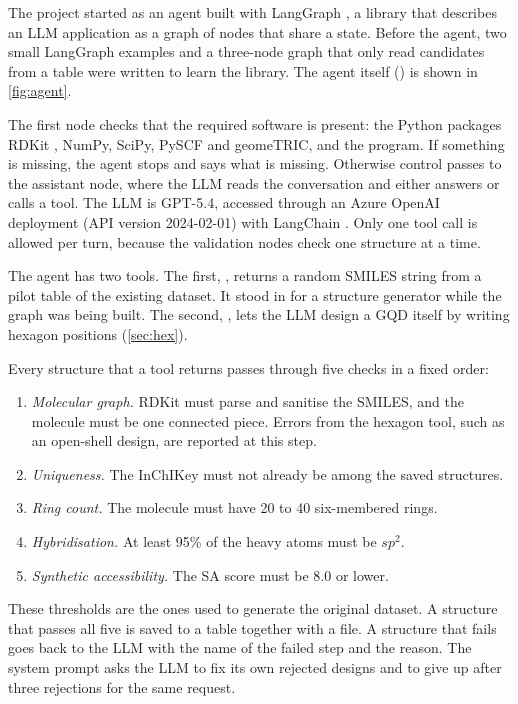 The project started as an agent built with LangGraph \cite{langgraph}, a library that describes an
LLM application as a graph of nodes that share a state. Before the agent, two small LangGraph
examples and a three-node graph that only read candidates from a table were written to learn the
library. The agent itself () is shown in \cref{fig:agent}.

The first node checks that the required software is present: the Python packages RDKit
\cite{rdkit}, NumPy, SciPy, PySCF \cite{sun2018pyscf} and geomeTRIC, and the  program. If
something is missing, the agent stops and says what is missing. Otherwise control passes to the
assistant node, where the LLM reads the conversation and either answers or calls a tool. The LLM is
GPT-5.4, accessed through an Azure OpenAI deployment (API version 2024-02-01) with LangChain
\cite{langchain}. Only one tool call is allowed per turn, because the validation nodes check one
structure at a time.

The agent has two tools. The first, , returns a random SMILES string from a
pilot table of the existing dataset. It stood in for a structure generator while the graph was
being built. The second, , lets the LLM design a GQD itself by
writing hexagon positions (\cref{sec:hex}).

Every structure that a tool returns passes through five checks in a fixed order:
\begin{enumerate}
  \item \emph{Molecular graph.} RDKit must parse and sanitise the SMILES, and the molecule must be
        one connected piece. Errors from the hexagon tool, such as an open-shell design, are
        reported at this step.
  \item \emph{Uniqueness.} The InChIKey must not already be among the saved structures.
  \item \emph{Ring count.} The molecule must have 20 to 40 six-membered rings.
  \item \emph{Hybridisation.} At least 95\% of the heavy atoms must be \(sp^2\).
  \item \emph{Synthetic accessibility.} The SA score \cite{ertl2009sascore} must be 8.0 or lower.
\end{enumerate}
These thresholds are the ones used to generate the original dataset. A structure that passes all
five is saved to a table together with a  file. A structure that fails goes back to the
LLM with the name of the failed step and the reason. The system prompt asks the LLM to fix its own
rejected designs and to give up after three rejections for the same request.

